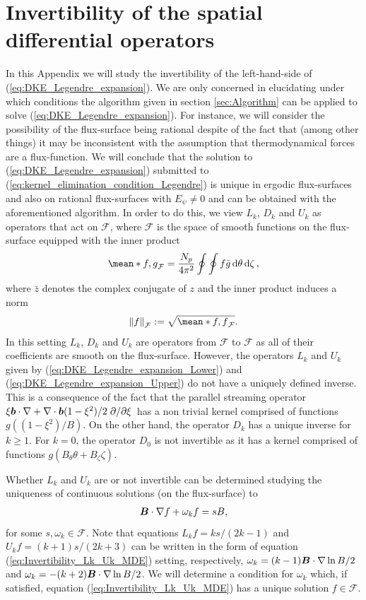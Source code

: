 \documentclass[10pt]{iopart}
\begin{document}
\section{Invertibility of the spatial differential operators}
\label{sec:Appendix_Invertibility} 
In this Appendix we will study
the invertibility of the left-hand-side of (\ref{eq:DKE_Legendre_expansion}). We are only concerned in elucidating under which conditions the algorithm given in section \ref{sec:Algorithm} can be applied to solve (\ref{eq:DKE_Legendre_expansion}). For instance, we will consider the possibility of the flux-surface being rational despite of the fact that (among other things) it may be inconsistent with the assumption that thermodynamical forces are a flux-function. We will conclude that the solution to (\ref{eq:DKE_Legendre_expansion}) submitted to (\ref{eq:kernel_elimination_condition_Legendre}) is unique in ergodic flux-surfaces and also on rational flux-surfaces with $E_\psi\ne 0$ and can be obtained with the aforementioned algorithm. In order to do this, we view $L_k$, $D_k$ and $U_k$ as operators that act on $\mathcal{F}$, where $\mathcal{F}$ is the space of smooth functions on the flux-surface equipped with the inner product
%
\begin{align}
	\mean*{f,g}_{\mathcal{F}}=\frac{N_p}{4\pi^2}\oint\oint f\bar{g}\dd{\theta}\dd{\zeta},
	\label{eq:Fourier_inner_product}
\end{align}
where $\bar{z}$ denotes the complex conjugate of $z$ and the inner product induces a norm 
%
\begin{align}
	\norm{f}_{\mathcal{F}}:=\sqrt{\mean*{f,f}_{\mathcal{F}}}.
	\label{eq:Fourier_norm}
\end{align}
In this setting $L_k$, $D_k$ and $U_k$ are operators from $\mathcal{F}$ to $\mathcal{F}$ as all of their coefficients are smooth on the flux-surface. However, the operators $L_k$ and $U_k$ given by (\ref{eq:DKE_Legendre_expansion_Lower}) and (\ref{eq:DKE_Legendre_expansion_Upper}) do not have a uniquely defined inverse. This is a consequence of the fact that the parallel streaming operator $\xi \vb*{b}\cdot \nabla+\nabla \cdot \vb*{b} {(1-\xi^2)}/{2}  \pdv*{\xi}$ has a non trivial kernel comprised of functions $g((1-\xi^2)/B)$. On the other hand, the operator $D_k$ has a unique inverse for $k\ge 1$. For $k=0$, the operator $D_0$ is not invertible as it has a kernel comprised of functions $g(B_\theta\theta + B_\zeta\zeta)$.

Whether $L_k$ and $U_k$ are or not invertible can be determined studying the uniqueness of continuous solutions (on the flux-surface) to
\begin{align}
	\vb*{B}\cdot \nabla f + \omega_k f = s B,
	\label{eq:Invertibility_Lk_Uk_MDE}
\end{align}
for some $s,\omega_k\in\mathcal{F}$. Note that equations $L_k f = ks/(2k-1)$ and $U_k f =(k+1)s/(2k+3)$ can be written in the form of equation (\ref{eq:Invertibility_Lk_Uk_MDE}) setting, respectively, $\omega_k=(k-1)\vb*{B}\cdot\nabla \ln B /2$ and $\omega_k=-(k+2)\vb*{B}\cdot\nabla \ln B /2$. We will determine a condition for $\omega_k$ which, if satisfied, equation (\ref{eq:Invertibility_Lk_Uk_MDE}) has a unique solution $f\in\mathcal{F}$.
\end{document}
